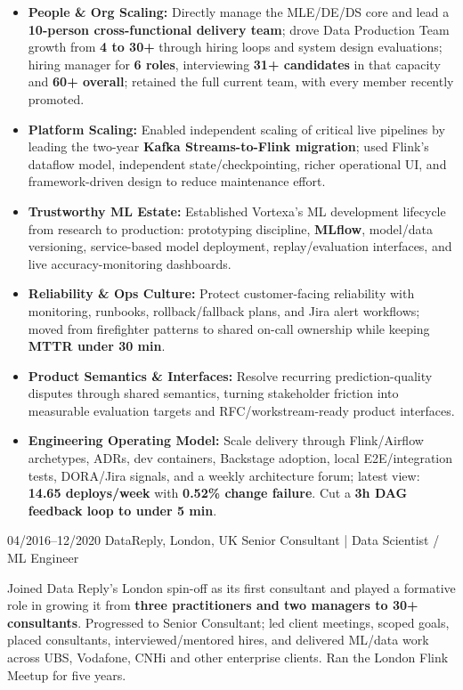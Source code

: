 \documentclass[]{../../../../friggeri-cv}
\begin{document}
\begin{entrylist}
{{    	}
	    \begin{itemize}[leftmargin=1.1em]
										        \item \footnotesize\textbf{People \& Org Scaling:} Directly manage the MLE/DE/DS core and lead a \textbf{10-person cross-functional delivery team}; drove Data Production Team growth from \textbf{4 to 30+} through hiring loops and system design evaluations; hiring manager for \textbf{6 roles}, interviewing \textbf{31+ candidates} in that capacity and \textbf{60+ overall}; retained the full current team, with every member recently promoted.
									        \item \footnotesize\textbf{Platform Scaling:} Enabled independent scaling of critical live pipelines by leading the two-year \textbf{Kafka Streams-to-Flink migration}; used Flink's dataflow model, independent state/checkpointing, richer operational UI, and framework-driven design to reduce maintenance effort.
									        \item \footnotesize\textbf{Trustworthy ML Estate:} Established Vortexa's ML development lifecycle from research to production: prototyping discipline, \textbf{MLflow}, model/data versioning, service-based model deployment, replay/evaluation interfaces, and live accuracy-monitoring dashboards.
									        \item \footnotesize\textbf{Reliability \& Ops Culture:} Protect customer-facing reliability with monitoring, runbooks, rollback/fallback plans, and Jira alert workflows; moved from firefighter patterns to shared on-call ownership while keeping \textbf{MTTR under 30 min}.
									        \item \footnotesize\textbf{Product Semantics \& Interfaces:} Resolve recurring prediction-quality disputes through shared semantics, turning stakeholder friction into measurable evaluation targets and RFC/workstream-ready product interfaces.
									        \item \footnotesize\textbf{Engineering Operating Model:} Scale delivery through Flink/Airflow archetypes, ADRs, dev containers, Backstage adoption, local E2E/integration tests, DORA/Jira signals, and a weekly architecture forum; latest view: \textbf{14.65 deploys/week} with \textbf{0.52\% change failure}. Cut a \textbf{3h DAG feedback loop to under 5 min}.
    	\end{itemize}
	}
    \entry
    {04/2016–12/2020}
    {DataReply, London, UK}
    {Senior Consultant | Data Scientist / ML Engineer}
    {
        {\small
        \setlength{\parindent}{0pt}
        \setlength{\leftskip}{0pt}
					        Joined Data Reply's London spin-off as its first consultant and played a formative role in growing it from \textbf{three practitioners and two managers to 30+ consultants}. Progressed to Senior Consultant; led client meetings, scoped goals, placed consultants, interviewed/mentored hires, and delivered ML/data work across UBS, Vodafone, CNHi and other enterprise clients. Ran the London Flink Meetup for five years.

}}
\end{entrylist}
\end{document}
